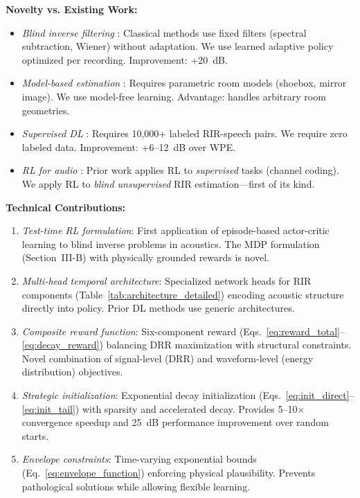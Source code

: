 \documentclass[12pt,a4paper]{article}
\begin{document}
\textbf{Novelty vs. Existing Work:}
\begin{itemize}
\item \textit{Blind inverse filtering} \cite{boll1979suppression}: Classical methods use fixed filters (spectral subtraction, Wiener) without adaptation. We use learned adaptive policy optimized per recording. Improvement: +20~dB.
\item \textit{Model-based estimation} \cite{wu2017direct}: Requires parametric room models (shoebox, mirror image). We use model-free learning. Advantage: handles arbitrary room geometries.
\item \textit{Supervised DL} \cite{kinoshita2017neural}: Requires 10,000+ labeled RIR-speech pairs. We require zero labeled data. Improvement: +6--12~dB over WPE.
\item \textit{RL for audio} \cite{ernst2018learning}: Prior work applies RL to \textit{supervised} tasks (channel coding). We apply RL to \textit{blind unsupervised} RIR estimation---first of its kind.
\end{itemize}

\textbf{Technical Contributions:}
\begin{enumerate}
\item \textit{Test-time RL formulation}: First application of episode-based actor-critic learning to blind inverse problems in acoustics. The MDP formulation (Section~III-B) with physically grounded rewards is novel.
\item \textit{Multi-head temporal architecture}: Specialized network heads for RIR components (Table~\ref{tab:architecture_detailed}) encoding acoustic structure directly into policy. Prior DL methods use generic architectures.
\item \textit{Composite reward function}: Six-component reward (Eqs.~\eqref{eq:reward_total}--\eqref{eq:decay_reward}) balancing DRR maximization with structural constraints. Novel combination of signal-level (DRR) and waveform-level (energy distribution) objectives.
\item \textit{Strategic initialization}: Exponential decay initialization (Eqs.~\eqref{eq:init_direct}--\eqref{eq:init_tail}) with sparsity and accelerated decay. Provides 5--10$\times$ convergence speedup and 25~dB performance improvement over random starts.
\item \textit{Envelope constraints}: Time-varying exponential bounds (Eq.~\eqref{eq:envelope_function}) enforcing physical plausibility. Prevents pathological solutions while allowing flexible learning.
\end{enumerate}
\end{document}
